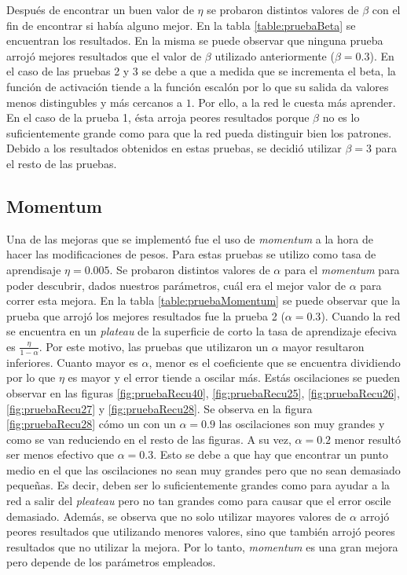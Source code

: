 \documentclass[11pt,a4paper]{article}
\begin{document}
Después de encontrar un buen valor de $\eta$ se probaron distintos valores de $\beta$ con el fin de encontrar si había alguno mejor. En la tabla \ref{table:pruebaBeta} se encuentran los resultados. En la misma se puede observar que ninguna prueba arrojó mejores resultados que el valor de $\beta$ utilizado anteriormente ($\beta = 0.3$). En el caso de las pruebas 2 y 3 se debe a que a medida que se incrementa el beta, la función de activación tiende a la función escalón por lo que su salida da valores menos distingubles y más cercanos a $1$. Por ello, a la red le cuesta más aprender. En el caso de la prueba 1, ésta arroja peores resultados porque $\beta$ no es lo suficientemente grande como para que la red pueda distinguir bien los patrones. Debido a los resultados obtenidos en estas pruebas, se decidió utilizar $\beta = 3$ para el resto de las pruebas.

\subsection{Momentum}
Una de las mejoras que se implementó fue el uso de \emph{momentum} a la hora de hacer las modificaciones de pesos. Para estas pruebas se utilizo como tasa de aprendisaje $\eta = 0.005$. Se probaron distintos valores de $\alpha$ para el \emph{momentum} para poder descubrir, dados nuestros parámetros, cuál era el mejor valor de $\alpha$ para correr esta mejora. En la tabla \ref{table:pruebaMomentum} se puede observar que la prueba que arrojó los mejores resultados fue la prueba 2 ($\alpha = 0.3$). Cuando la red se encuentra en un \emph{plateau} de la superficie de corto la tasa de aprendizaje efeciva es $\frac{\eta}{1 - \alpha}$. Por este motivo, las pruebas que utilizaron un $\alpha$ mayor resultaron inferiores. Cuanto mayor es $\alpha$, menor es el coeficiente que se encuentra dividiendo por lo que $\eta$ es mayor y el error tiende a oscilar más. Estás oscilaciones se pueden observar en las figuras \ref{fig:pruebaRecu40}, \ref{fig:pruebaRecu25}, \ref{fig:pruebaRecu26}, \ref{fig:pruebaRecu27} y \ref{fig:pruebaRecu28}. Se observa en la figura \ref{fig:pruebaRecu28} cómo un con un $\alpha = 0.9$ las oscilaciones son muy grandes y como se van reduciendo en el resto de las figuras.  A su vez,  $\alpha = 0.2$ menor resultó ser menos efectivo que $\alpha = 0.3$. Esto se debe a que hay que encontrar un punto medio en el que las oscilaciones no sean muy grandes pero que no sean demasiado pequeñas. Es decir, deben ser lo suficientemente grandes como para ayudar a la red a salir del \emph{pleateau} pero no tan grandes como para causar que el error oscile demasiado. Además, se observa que no solo utilizar mayores valores de $\alpha$ arrojó peores resultados que utilizando menores valores, sino que también arrojó peores resultados que no utilizar la mejora. Por lo tanto, \emph{momentum} es una gran mejora pero depende de los parámetros empleados. 
   
\end{document}
